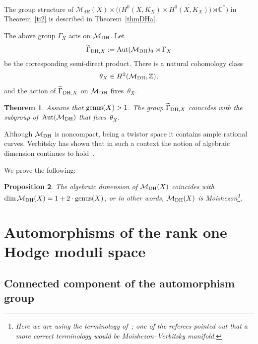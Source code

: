 \documentclass[pdftex]{sigma}
\numberwithin{equation}{section}
\newtheorem{Theorem}{Theorem}[section]
\newtheorem{Proposition}[Theorem]{Proposition}
 { \theoremstyle{definition}
\newtheorem{Definition}[Theorem]{Definition}
\newtheorem{Remark}[Theorem]{Remark} }
\begin{document}
The group structure of $\mathcal M_{dR}(X)\times \big(\big(H^0(X, K_X)\times\overline{H^0(X, K_X)}\big)\rtimes \mathbb C^*\big)$ in Theorem~\ref{ti2} is described in Theorem~\ref{thmDHa}.

The above group $\Gamma_X$ acts on ${\mathcal M}_{\rm DH}$. Let
\begin{gather*}
\widetilde{\Gamma}_{{\rm DH},X} := \operatorname{Aut}({\mathcal M}_{\rm DH})_0\rtimes \Gamma_X
\end{gather*}
be the corresponding semi-direct product. There is a natural cohomology class
\begin{gather*}
\theta_X \in H^2({\mathcal M}_{\rm DH}, {\mathbb Z}) ,
\end{gather*}
and the action of $\widetilde{\Gamma}_{{\rm DH},X}$ on ${\mathcal M}_{\rm DH}$ f\/ixes~$\theta_X$.

\begin{Theorem}Assume that ${\rm genus}(X) > 1$. The group $\widetilde{\Gamma}_{{\rm DH},X}$ coincides with the subgroup of~$\operatorname{Aut}({\mathcal M}_{\rm DH})$ that fixes~$\theta_X$.
\end{Theorem}

Although ${\mathcal M}_{\rm DH}$ is noncompact, being a twistor space it contains ample rational curves. Verbitsky has shown that in such a context the notion of algebraic dimension continues to hold~\cite{Ve}.

We prove the following:

\begin{Proposition} The algebraic dimension of ${\mathcal M}_{\rm DH}(X)$ coincides with $\dim {\mathcal M}_{\rm DH}(X) = 1+2\cdot {\rm genus}(X)$, or in other words, ${\mathcal M}_{\rm DH}(X)$ is Moishezon\footnote{Here we are using the terminology of~\cite{Ve}; one of the referees pointed out that a more correct terminology would be \textit{Moishezon--Verbitsky manifold}.}.
\end{Proposition}

\section{Automorphisms of the rank one Hodge moduli space}\label{auto-hodge}

\subsection{Connected component of the automorphism group}
\end{document}
